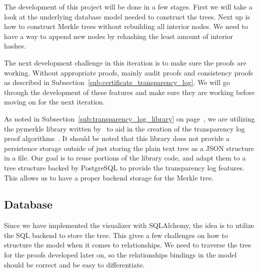 \documentclass[../Main/thesis.tex]{subfiles}
\begin{document}
The development of this project will be done in a few stages. First we will take
a look at the underlying database model needed to construct the trees. Next up
is how to construct Merkle trees without rebuilding all interior nodes. We need
to have a way to append new nodes by rehashing the least amount of interior
hashes.

The next development challenge in this iteration is to make sure the proofs are
working. Without appropriate proofs, mainly audit proofs and consistency proofs
as described in Subsection~\ref{sub:certificate_transparency_log}. We will go
through the development of these features and make sure they are working before
moving on for the next iteration.

As noted in Subsection~\ref{sub:transparency_log_library} on
page~\pageref{sub:transparency_log_library}, we are utilizing the pymerkle 
library written by~\citeauthor{pymerkeltools} to aid in the creation of the
transparency log proof algorithms~\cite{pymerkeltools}. It should be noted that
this library does not provide a persistence storage outside of just storing the
plain text tree as a JSON structure in a file. Our goal is to reuse portions of
the library code, and adapt them to a tree structure backed by PostgreSQL to
provide the transparency log features. This allows us to have a proper backend
storage for the Merkle tree.


\subsection*{Database}%
\label{sub:database}
Since we have implemented the visualizer with SQLAlchemy, the idea is to
utilize the SQL backend to store the tree. This gives a few challenges on how to
structure the model when it comes to relationships. We need to traverse the
tree for the proofs developed later on, so the relationships bindings in the
model should be correct and be easy to differentiate.
\end{document}

